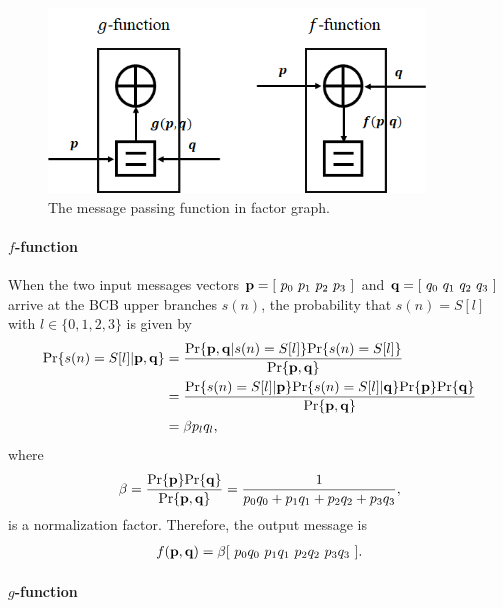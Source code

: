 \begin{figure}
 \centering
 \includegraphics[width=10cm]{fig/BCB_function.png}
 \caption{The message passing function in factor graph.}
 \label{fig:BCB function}
\end{figure}



\paragraph{$f$-function}

When the two input messages vectors ${\bf p} = [ \ p_0 \ p_1 \ p_2 \ p_3 \ ]$ and ${\bf q} = [ \ q_0 \ q_1 \ q_2 \ q_3 \ ]$ arrive at the BCB upper branches $s(n)$, the probability that $s(n)=S[l]$ with $l \in \{0 ,1, 2, 3\}$ is given by
\begin{align}
 \text{Pr}\{s(n)=S[l]|{\bf p}, {\bf q}\} & = \frac{\text{Pr}\{{\bf p}, {\bf q}|s(n)=S[l]\}\text{Pr}\{s(n)=S[l]\}}{\text{Pr}\{{\bf p}, {\bf q}\}} \nonumber \\
 & = \frac{\text{Pr}\{s(n)=S[l]|{\bf p}\}\text{Pr}\{s(n)=S[l]|{\bf q}\}\text{Pr}\{{\bf p}\}\text{Pr}\{{\bf q}\}}{\text{Pr}\{{\bf p}, {\bf q}\}} \nonumber \\
 & = \beta p_l q_l ,
\end{align}
where
\begin{align}
 \beta = \frac{\text{Pr}\{{\bf p}\}\text{Pr}\{{\bf q}\}}{\text{Pr}\{{\bf p}, {\bf q}\}} = \frac{1}{p_0 q_0 + p_1 q_1 + p_2 q_2 + p_3 q_3} ,
\end{align}
is a normalization factor. Therefore, the output message is
\begin{align}
 f({\bf p}, {\bf q}) = \beta [ \ p_0 q_0 \ p_1 q_1 \ p_2 q_2 \ p_3 q_3 \ ] .
\end{align}

\paragraph{$g$-function}
	
